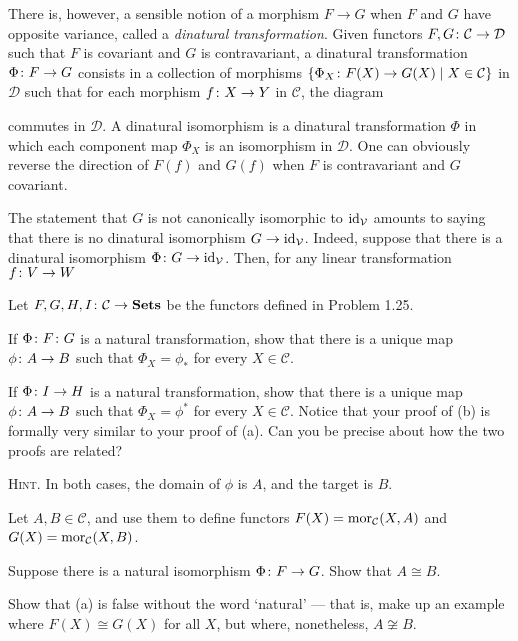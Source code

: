 There is, however, a sensible notion of a morphism $F\to G$ when $F$ and $G$ have opposite variance, called a \emph{dinatural transformation}. Given functors $F,G\colon \mathcal{C}\to\mathcal{D}$ such that $F$ is covariant and $G$ is contravariant, a dinatural transformation $\Phi\colon F\to G$ consists in a collection of morphisms $\{\Phi_X\colon F(X)\to G(X)\mid X\in \mathcal{C}\}$ in $\mathcal{D}$ such that for each morphism $f\colon X\to Y$ in $\mathcal{C}$, the diagram
\bse
{}
\ese
commutes in $\mathcal{D}$. A dinatural isomorphism is a dinatural transformation $\Phi$ in which each component map $\Phi_X$ is an isomorphism in $\mathcal{D}$. One can obviously reverse the direction of $F(f)$ and $G(f)$ when $F$ is contravariant and $G$ covariant.

The statement that $G$ is not canonically isomorphic to $\mathrm{id}_{\mathcal{V}}$ amounts to saying that there is no dinatural isomorphism $G\to \mathrm{id}_{\mathcal{V}}$. Indeed, suppose that there is a dinatural isomorphism $\Phi\colon G\to \mathrm{id}_{\mathcal{V}}$. Then, for any linear transformation $f\colon V\to W$
\een
\es

\addtocounter{exercise}{1}

\bp
Let $F,G, H, I \colon \mathcal{C} \to \mathbf{Sets}$ be the functors defined in Problem 1.25.
\ben[label=(\alph*)]
\item If $\Phi\colon F\colon G$ is a natural transformation, show that there is a unique map $\phi \colon A \to B$ such that $\Phi_X = \phi_*$ for every $X \in \mathcal{C}$.
\item If $\Phi \colon I \to H$ is a natural transformation, show that there is a unique map $\phi\colon A \to B$ such that $\Phi_X = \phi^*$ for every $X \in \mathcal{C}$.
\een
Notice that your proof of (b) is formally very similar to your proof of (a). Can you be precise about how the two proofs are related?

{\scshape Hint}. In both cases, the domain of $\phi$ is $A$, and the target is $B$.
\ep

\bs
\ben[label=(\alph*)]
\item
\item
\een
\es

\bp
Let $A,B \in \mathcal{C}$, and use them to define functors $F(X) = \operatorname{mor}_{\mathcal{C}}(X,A)$ and $G(X) = \operatorname{mor}_{\mathcal{C}}(X,B)$.
\ben[label=(\alph*)]
\item Suppose there is a natural isomorphism $\Phi \colon F \to G$. Show that $A\cong B$.
\item Show that (a) is false without the word `natural' --- that is, make up an example where $F(X)\cong G(X)$ for all $X$, but where, nonetheless, $A\not\cong B$.

